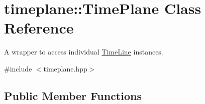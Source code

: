 \hypertarget{classtimeplane_1_1_time_plane}{}\section{timeplane\+:\+:Time\+Plane Class Reference}
\label{classtimeplane_1_1_time_plane}


A wrapper to access individual {\ttfamily \hyperlink{classtimeplane_1_1_time_line}{Time\+Line}} instances.  




{\ttfamily \#include $<$timeplane.\+hpp$>$}

\subsection*{Public Member Functions}
